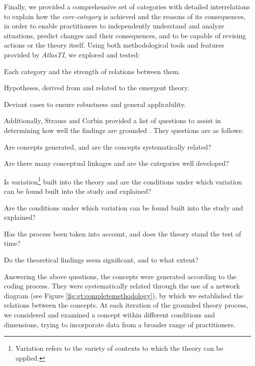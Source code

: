 \documentclass[10pt,journal,letterpaper,compsoc]{IEEEtran}
\begin{document}
Finally, we provided a comprehensive set of categories with detailed 
interrelations to explain how the \textit{core-category} is achieved and the 
reasons of its consequences, in order to enable practitioners to independently 
understand and analyze situations, predict changes and their consequences, and 
to be capable of revising actions or the theory itself. Using both 
methodological tools and features provided by \textit{AtlasTI}, we explored and 
tested:

\par\vspace {0.4cm}
\begin{compactitem}
\item Each category and the strength of relations between them.
\item Hypotheses, derived from and related to the emergent theory.
\item Deviant cases to ensure robustness and general applicability.
\end{compactitem}
\par\vspace {0.4cm}

Additionally, Strauss and Corbin provided a list of questions to assist in 
determining how well the findings are grounded \cite{Strauss1998}. They 
questions are as follows:

\par\vspace {0.4cm}
\begin{compactenum}
\item Are concepts generated, and are the concepts systematically related?
\item Are there many conceptual linkages and are the categories well developed?
\item Is variation\footnote{Variation refers to the variety of contexts to 
which the theory can be applied.} built into the theory and are the conditions 
under which variation can be found built into the study and explained?
\item Are the conditions under which variation can be found built into the 
study and explained?
\item Has the process been taken into account, and does the theory stand the 
test of time?
\item Do the theoretical findings seem significant, and to what extent?
\end{compactenum}
\par\vspace {0.4cm}

Answering the above questions, the concepts were generated according to the 
coding process. They were systematically related through the use of a network 
diagram (see Figure \ref{fig:gt:completemethodology}), by which we established 
the relations between the concepts. At each iteration of the 
grounded theory process, we considered and examined a concept within different 
conditions and dimensions, trying to incorporate data from a broader range of 
practitioners. 
\end{document}
